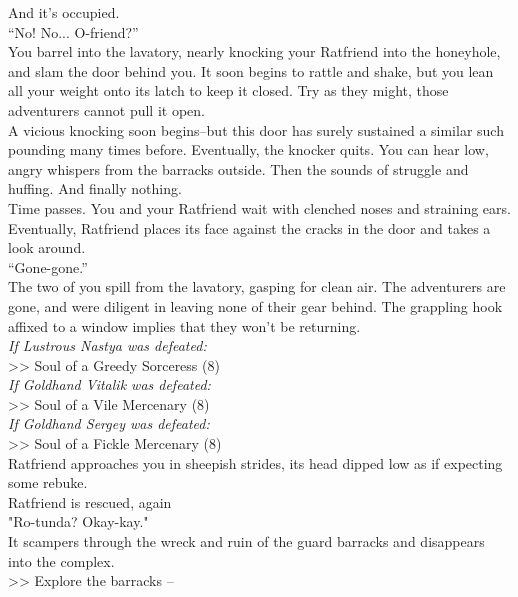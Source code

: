 And it’s occupied.\\

“No! No... O-friend?”\\

You barrel into the lavatory, nearly knocking your Ratfriend into the honeyhole, and slam the door behind you. It soon begins to rattle and shake, but you lean all your weight onto its latch to keep it closed. Try as they might, those adventurers cannot pull it open.\\

A vicious knocking soon begins--but this door has surely sustained a similar such pounding many times before. Eventually, the knocker quits. You can hear low, angry whispers from the barracks outside. Then the sounds of struggle and huffing. And finally nothing.\\

Time passes. You and your Ratfriend wait with clenched noses and straining ears. Eventually, Ratfriend places its face against the cracks in the door and takes a look around.\\

“Gone-gone.”\\

The two of you spill from the lavatory, gasping for clean air. The adventurers are gone, and were diligent in leaving none of their gear behind. The grappling hook affixed to a window implies that they won't be returning.\\

\emph{If Lustrous Nastya was defeated:}\\
>> Soul of a Greedy Sorceress (8)\\

\emph{If Goldhand Vitalik was defeated:}\\
>> Soul of a Vile Mercenary (8)\\

\emph{If Goldhand Sergey was defeated:}\\
>> Soul of a Fickle Mercenary (8)\\

Ratfriend approaches you in sheepish strides, its head dipped low as if expecting some rebuke.\\
 Ratfriend is rescued, again\\

"Ro-tunda? Okay-kay."\\

It scampers through the wreck and ruin of the guard barracks and disappears into the complex.\\

>> Explore the barracks -- 
